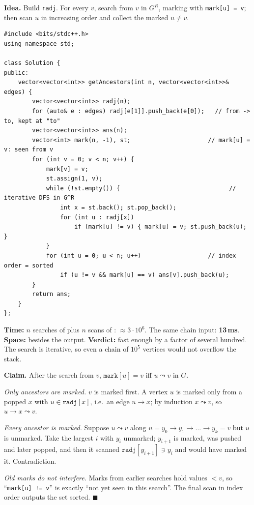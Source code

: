 \begin{algorithmbox}
\textbf{Idea.} Build \texttt{radj}. For every $v$, search from $v$ in $G^R$, marking with \texttt{mark[u] = v}; then scan $u$ in increasing order and collect the marked $u \ne v$.

\begin{lstlisting}[style=cpp]
#include <bits/stdc++.h>
using namespace std;

class Solution {
public:
    vector<vector<int>> getAncestors(int n, vector<vector<int>>& edges) {
        vector<vector<int>> radj(n);
        for (auto& e : edges) radj[e[1]].push_back(e[0]);   // from -> to, kept at "to"
        vector<vector<int>> ans(n);
        vector<int> mark(n, -1), st;                      // mark[u] = v: seen from v
        for (int v = 0; v < n; v++) {
            mark[v] = v;
            st.assign(1, v);
            while (!st.empty()) {                               // iterative DFS in G^R
                int x = st.back(); st.pop_back();
                for (int u : radj[x])
                    if (mark[u] != v) { mark[u] = v; st.push_back(u); }
            }
            for (int u = 0; u < n; u++)                   // index order = sorted
                if (u != v && mark[u] == v) ans[v].push_back(u);
        }
        return ans;
    }
};
\end{lstlisting}

\begin{complexitybox}
\textbf{Time:} $n$ searches of  plus $n$ scans of :  $\approx 3 \cdot 10^6$. The same chain input: \textbf{13\,ms}. \textbf{Space:}  besides the output. \textbf{Verdict:} fast enough by a factor of several hundred. The search is iterative, so even a chain of $10^5$ vertices would not overflow the stack.
\end{complexitybox}
\end{algorithmbox}

\begin{invariantbox}
\textbf{Claim.} After the search from $v$, $\texttt{mark}[u] = v$ iff $u \leadsto v$ in $G$.

\emph{Only ancestors are marked.} $v$ is marked first. A vertex $u$ is marked only from a popped $x$ with $u \in \texttt{radj}[x]$, i.e.\ an edge $u \to x$; by induction $x \leadsto v$, so $u \to x \leadsto v$.

\emph{Every ancestor is marked.} Suppose $u \leadsto v$ along $u = y_0 \to y_1 \to \dots \to y_k = v$ but $u$ is unmarked. Take the largest $i$ with $y_i$ unmarked; $y_{i+1}$ is marked, was pushed and later popped, and then it scanned $\texttt{radj}[y_{i+1}] \ni y_i$ and would have marked it. Contradiction.

\emph{Old marks do not interfere.} Marks from earlier searches hold values $< v$, so ``\texttt{mark[u] != v}'' is exactly ``not yet seen in this search''. The final scan in index order outputs the set sorted. \hfill$\blacksquare$
\end{invariantbox}


